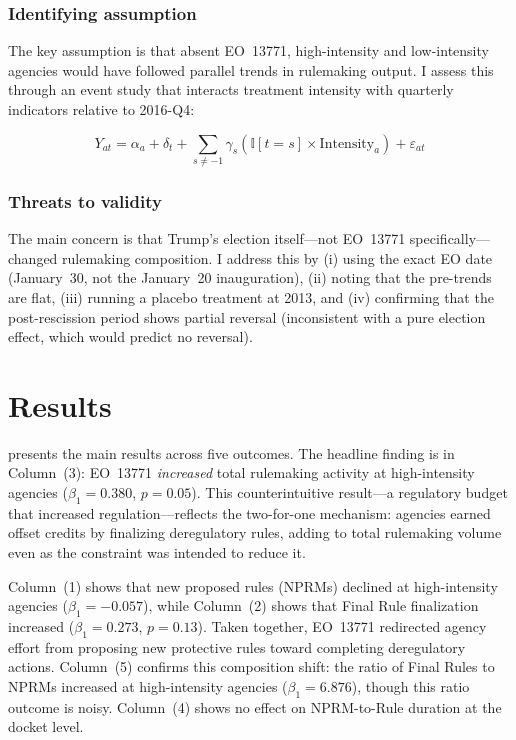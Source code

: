 \documentclass[12pt]{article}
\newcommand{\ind}{\mathbb{I}}
\begin{document}
\subsubsection*{Identifying assumption} The key assumption is that absent EO~13771, high-intensity and low-intensity agencies would have followed parallel trends in rulemaking output. I assess this through an event study that interacts treatment intensity with quarterly indicators relative to 2016-Q4:

\begin{equation}
Y_{at} = \alpha_a + \delta_t + \sum_{s \neq -1} \gamma_s (\ind[t = s] \times \text{Intensity}_a) + \varepsilon_{at}
\label{eq:event}
\end{equation}

\subsubsection*{Threats to validity} The main concern is that Trump's election itself---not EO~13771 specifically---changed rulemaking composition. I address this by (i) using the exact EO date (January~30, not the January~20 inauguration), (ii) noting that the pre-trends are flat, (iii) running a placebo treatment at 2013, and (iv) confirming that the post-rescission period shows partial reversal (inconsistent with a pure election effect, which would predict no reversal).

\section{Results}
\label{sec:results}



 presents the main results across five outcomes. The headline finding is in Column~(3): EO~13771 \textit{increased} total rulemaking activity at high-intensity agencies ($\beta_1 = 0.380$, $p = 0.05$). This counterintuitive result---a regulatory budget that increased regulation---reflects the two-for-one mechanism: agencies earned offset credits by finalizing deregulatory rules, adding to total rulemaking volume even as the constraint was intended to reduce it.

Column~(1) shows that new proposed rules (NPRMs) declined at high-intensity agencies ($\beta_1 = -0.057$), while Column~(2) shows that Final Rule finalization increased ($\beta_1 = 0.273$, $p = 0.13$). Taken together, EO~13771 redirected agency effort from proposing new protective rules toward completing deregulatory actions. Column~(5) confirms this composition shift: the ratio of Final Rules to NPRMs increased at high-intensity agencies ($\beta_1 = 6.876$), though this ratio outcome is noisy. Column~(4) shows no effect on NPRM-to-Rule duration at the docket level.
\end{document}
